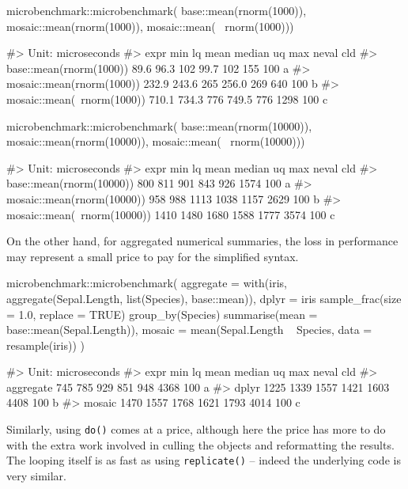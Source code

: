 \begin{Schunk}
\begin{Sinput}
microbenchmark::microbenchmark( 
  base::mean(rnorm(1000)), 
  mosaic::mean(rnorm(1000)), 
  mosaic::mean(~ rnorm(1000)))
\end{Sinput}
\begin{Soutput}
#> Unit: microseconds
#>                        expr   min    lq mean median  uq  max neval cld
#>     base::mean(rnorm(1000))  89.6  96.3  102   99.7 102  155   100 a  
#>   mosaic::mean(rnorm(1000)) 232.9 243.6  265  256.0 269  640   100  b 
#>  mosaic::mean(~rnorm(1000)) 710.1 734.3  776  749.5 776 1298   100   c
\end{Soutput}
\begin{Sinput}
microbenchmark::microbenchmark( 
  base::mean(rnorm(10000)), 
  mosaic::mean(rnorm(10000)), 
  mosaic::mean(~ rnorm(10000)))
\end{Sinput}
\begin{Soutput}
#> Unit: microseconds
#>                         expr  min   lq mean median   uq  max neval cld
#>     base::mean(rnorm(10000))  800  811  901    843  926 1574   100 a  
#>   mosaic::mean(rnorm(10000))  958  988 1113   1038 1157 2629   100  b 
#>  mosaic::mean(~rnorm(10000)) 1410 1480 1680   1588 1777 3574   100   c
\end{Soutput}
\end{Schunk}

On the other hand, for aggregated numerical summaries, the loss in
performance may represent a small price to pay for the simplified
syntax.

\begin{Schunk}
\begin{Sinput}
microbenchmark::microbenchmark( 
  aggregate = with(iris, aggregate(Sepal.Length, list(Species), base::mean)),
  dplyr = iris %
    sample_frac(size = 1.0, replace = TRUE) %
    group_by(Species) %
    summarise(mean = base::mean(Sepal.Length)),
  mosaic = mean(Sepal.Length ~ Species, data = resample(iris))
)
\end{Sinput}
\begin{Soutput}
#> Unit: microseconds
#>       expr  min   lq mean median   uq  max neval cld
#>  aggregate  745  785  929    851  948 4368   100 a  
#>      dplyr 1225 1339 1557   1421 1603 4408   100  b 
#>     mosaic 1470 1557 1768   1621 1793 4014   100   c
\end{Soutput}
\end{Schunk}

Similarly, using \texttt{do()} comes at a price, although here the price
has more to do with the extra work involved in culling the objects and
reformatting the results. The looping itself is as fast as using
\texttt{replicate()} -- indeed the underlying code is very similar.

